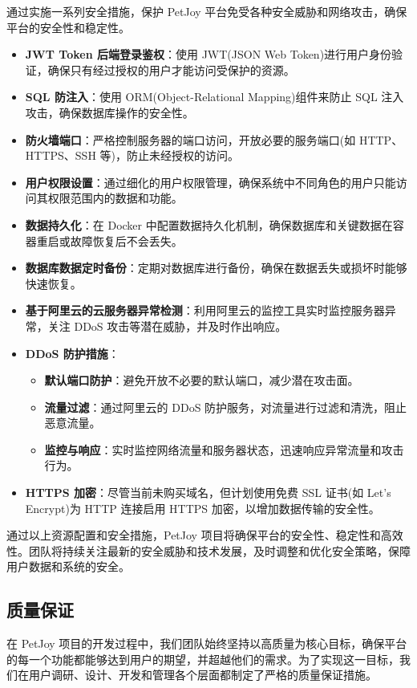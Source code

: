 通过实施一系列安全措施，保护 PetJoy 平台免受各种安全威胁和网络攻击，确保平台的安全性和稳定性。

\begin{itemize}
    \item \textbf{JWT Token 后端登录鉴权}：使用 JWT(JSON Web Token)进行用户身份验证，确保只有经过授权的用户才能访问受保护的资源。
    \item \textbf{SQL 防注入}：使用 ORM(Object-Relational Mapping)组件来防止 SQL 注入攻击，确保数据库操作的安全性。
    \item \textbf{防火墙端口}：严格控制服务器的端口访问，开放必要的服务端口(如 HTTP、HTTPS、SSH 等)，防止未经授权的访问。
    \item \textbf{用户权限设置}：通过细化的用户权限管理，确保系统中不同角色的用户只能访问其权限范围内的数据和功能。
    \item \textbf{数据持久化}：在 Docker 中配置数据持久化机制，确保数据库和关键数据在容器重启或故障恢复后不会丢失。
    \item \textbf{数据库数据定时备份}：定期对数据库进行备份，确保在数据丢失或损坏时能够快速恢复。
    \item \textbf{基于阿里云的云服务器异常检测}：利用阿里云的监控工具实时监控服务器异常，关注 DDoS 攻击等潜在威胁，并及时作出响应。
    \item \textbf{DDoS 防护措施}：
    \begin{itemize}
      \item \textbf{默认端口防护}：避免开放不必要的默认端口，减少潜在攻击面。
      \item \textbf{流量过滤}：通过阿里云的 DDoS 防护服务，对流量进行过滤和清洗，阻止恶意流量。
      \item \textbf{监控与响应}：实时监控网络流量和服务器状态，迅速响应异常流量和攻击行为。
    \end{itemize}
    \item \textbf{HTTPS 加密}：尽管当前未购买域名，但计划使用免费 SSL 证书(如 Let's Encrypt)为 HTTP 连接启用 HTTPS 加密，以增加数据传输的安全性。
\end{itemize}
  
通过以上资源配置和安全措施，PetJoy 项目将确保平台的安全性、稳定性和高效性。团队将持续关注最新的安全威胁和技术发展，及时调整和优化安全策略，保障用户数据和系统的安全。

\subsection{质量保证}
    
在 PetJoy 项目的开发过程中，我们团队始终坚持以高质量为核心目标，确保平台的每一个功能都能够达到用户的期望，并超越他们的需求。为了实现这一目标，我们在用户调研、设计、开发和管理各个层面都制定了严格的质量保证措施。
    
